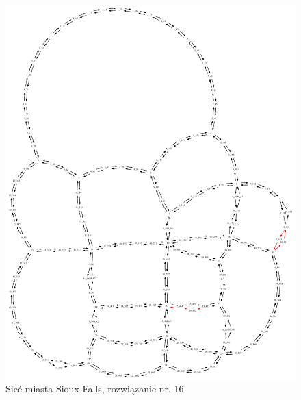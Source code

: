 \documentclass[twoside,12pt]{report}
\begin{document}
\begin{figure}[ht]
\centering
\includegraphics[totalheight=0.580\textheight, angle=90]{img/sioux-out/16/network2}
\caption{Sieć miasta Sioux Falls, rozwiązanie nr. 16}
\label{sioux16}
\end{figure}
\end{document}
